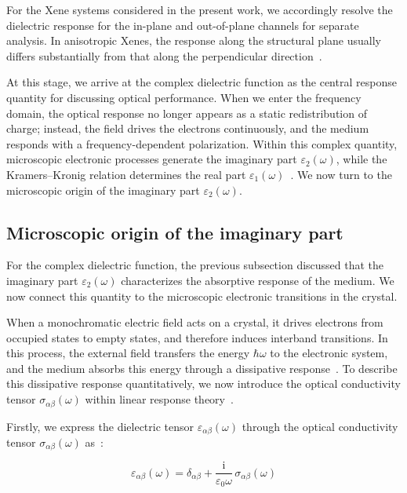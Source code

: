 For the Xene systems considered in the present work,
we accordingly resolve the dielectric response for the in-plane and out-of-plane channels for separate analysis.
In anisotropic Xenes, the response along the structural plane usually differs substantially from that along the perpendicular direction~\cite{marinopoulos2002anisotropy,huang2023optical,slavich2024exploring,cheng2025two}.

At this stage, we arrive at the complex dielectric function as the central response quantity for discussing optical performance.
When we enter the frequency domain, the optical response no longer appears as a static redistribution of charge;
instead, the field drives the electrons continuously, and the medium responds with a frequency-dependent polarization.
Within this complex quantity, microscopic electronic processes generate the imaginary part $\varepsilon_2(\omega)$,
while the Kramers--Kronig relation determines the real part $\varepsilon_1(\omega)$~\cite{de1926theory, toll1956causality, persson2001first}.
We now turn to the microscopic origin of the imaginary part $\varepsilon_2(\omega)$.

\FloatBarrier
\subsection{Microscopic origin of the imaginary part}

For the complex dielectric function,
the previous subsection discussed that the imaginary part $\varepsilon_2(\omega)$ characterizes the absorptive response of the medium.
We now connect this quantity to the microscopic electronic transitions in the crystal.

When a monochromatic electric field acts on a crystal,
it drives electrons from occupied states to empty states,
and therefore induces interband transitions.
In this process, the external field transfers the energy $\hbar\omega$ to the electronic system,
and the medium absorbs this energy through a dissipative response~\cite{toudert2017interband}.
To describe this dissipative response quantitatively,
we now introduce the optical conductivity tensor $\sigma_{\alpha\beta}(\omega)$ within linear response theory~\cite{kubo1957statistical}.

Firstly, we express the dielectric tensor $\varepsilon_{\alpha\beta}(\omega)$ through the optical conductivity tensor $\sigma_{\alpha\beta}(\omega)$ as~\cite{kubo1957statistical,onida2002electronic}:

\begin{equation}
    \varepsilon_{\alpha\beta}(\omega)
    = \delta_{\alpha\beta} + \frac{\mathrm{i}}{\varepsilon_0\omega}\,
    \sigma_{\alpha\beta}(\omega)
\label{dielectric_tensor_from_optical_conductivity}
\end{equation}

